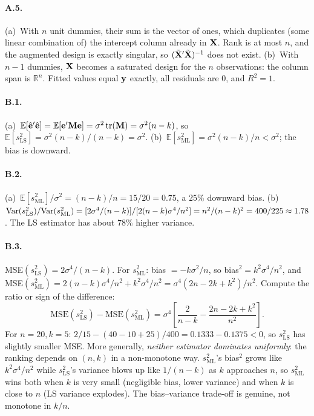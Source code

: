 \documentclass{article}
\newcommand{\E}{\mathbb{E}}
\begin{document}
\paragraph{A.5.}  (a)~With $n$ unit dummies, their sum is the vector of ones, which duplicates (some linear combination of) the intercept column already in ${\mathbf X}$.  Rank is at most $n$, and the augmented design is exactly singular, so $(\tilde{{\mathbf X}}'\tilde{{\mathbf X}})^{-1}$ does not exist.  (b)~With $n-1$ dummies, ${\mathbf X}$ becomes a saturated design for the $n$ observations: the column span is $\mathbb{R}^n$.  Fitted values equal ${\mathbf y}$ exactly, all residuals are $0$, and $R^2 = 1$.

\bigskip

\paragraph{B.1.}  (a)~$\E[\hat\bfe'\hat\bfe] = \E[\bfe'\bfM\bfe] = \sigma^2\,\text{tr}(\bfM) = \sigma^2(n - k)$, so $\E[s_{\text{LS}}^2] = \sigma^2(n-k)/(n-k) = \sigma^2$.  (b)~$\E[s_{\text{ML}}^2] = \sigma^2(n-k)/n < \sigma^2$; the bias is downward.

\paragraph{B.2.}  (a)~$\E[s_{\text{ML}}^2]/\sigma^2 = (n-k)/n = 15/20 = 0.75$, a $25\%$ downward bias.  (b)~$\mbox{Var}(s_{\text{LS}}^2)/\mbox{Var}(s_{\text{ML}}^2) = [2\sigma^4/(n-k)] / [2(n-k)\sigma^4/n^2] = n^2/(n-k)^2 = 400/225 \approx 1.78$.  The LS estimator has about $78\%$ higher variance.

\paragraph{B.3.}  MSE$(s_{\text{LS}}^2) = 2\sigma^4/(n-k)$.  For $s_{\text{ML}}^2$: bias $= -k\sigma^2/n$, so bias$^2 = k^2\sigma^4/n^2$, and MSE$(s_{\text{ML}}^2) = 2(n-k)\sigma^4/n^2 + k^2\sigma^4/n^2 = \sigma^4(2n - 2k + k^2)/n^2$.  Compute the ratio or sign of the difference:
$$\text{MSE}(s_{\text{LS}}^2) - \text{MSE}(s_{\text{ML}}^2) = \sigma^4\left[\frac{2}{n-k} - \frac{2n - 2k + k^2}{n^2}\right].$$
For $n = 20, k = 5$: $2/15 - (40 - 10 + 25)/400 = 0.1333 - 0.1375 < 0$, so $s_{\text{LS}}^2$ has slightly smaller MSE.  More generally, \emph{neither estimator dominates uniformly}: the ranking depends on $(n, k)$ in a non-monotone way.  $s_{\text{ML}}^2$'s bias$^2$ grows like $k^2\sigma^4/n^2$ while $s_{\text{LS}}^2$'s variance blows up like $1/(n-k)$ as $k$ approaches $n$, so $s_{\text{ML}}^2$ wins both when $k$ is very small (negligible bias, lower variance) and when $k$ is close to $n$ (LS variance explodes).  The bias--variance trade-off is genuine, not monotone in $k/n$.
\end{document}
